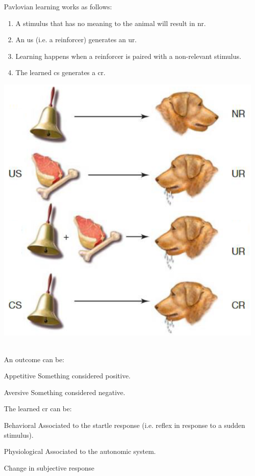 Pavlovian learning works as follows:\\
\begin{minipage}{0.58\linewidth}
    \begin{enumerate}[label=\alph*.]
        \item A stimulus that has no meaning to the animal will result in \ac{nr}.
        \item An \ac{us} (i.e. a reinforcer) generates an \ac{ur}.
        \item Learning happens when a reinforcer is paired with a non-relevant stimulus.
        \item The learned \ac{cs} generates a \ac{cr}.
    \end{enumerate}
\end{minipage}
\begin{minipage}{0.4\linewidth}
    \raggedleft
    \includegraphics[width=0.9\linewidth]{./img/pavlovian_example.png}
\end{minipage}\\

An outcome can be:
\begin{descriptionlist}
    \item[Appetitive] Something considered positive.
    \item[Aversive] Something considered negative.
\end{descriptionlist}

The learned \acl{cr} can be:
\begin{descriptionlist}
    \item[Behavioral] Associated to the startle response (i.e. reflex in response to a sudden stimulus).
    \item[Physiological] Associated to the autonomic system.
    \item[Change in subjective response] 
\end{descriptionlist}

